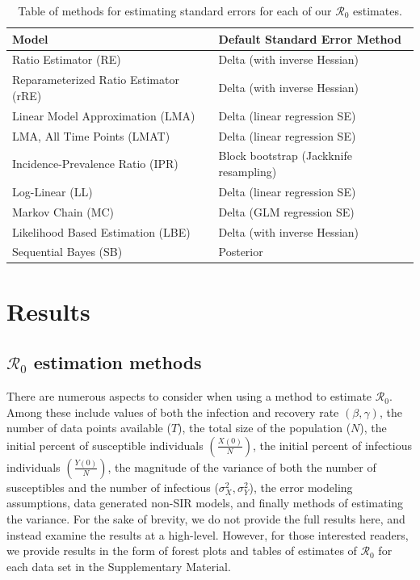 \documentclass[12pt]{article}
\newcommand{\rr}{\ensuremath{\mathcal{R}_0}}
\begin{document}
\begin{table}[H]
	\centering
	\begin{tabular}{@{}ll@{}}
		\toprule
		\textbf{Model} & \textbf{Default Standard Error Method} \\ \midrule
		Ratio Estimator (RE) & Delta (with inverse Hessian)\\
		Reparameterized Ratio Estimator (rRE) & Delta (with inverse Hessian) \\
		Linear Model Approximation (LMA) & Delta (linear regression SE) \\
		LMA, All Time Points  (LMAT)& Delta (linear regression SE)\\
		Incidence-Prevalence Ratio (IPR) & Block bootstrap (Jackknife resampling) \\
		Log-Linear (LL) & Delta (linear regression SE) \\
          Markov Chain (MC) & Delta (GLM regression SE) \\
          Likelihood Based Estimation (LBE) & Delta (with inverse Hessian)\\
		Sequential Bayes (SB) & Posterior\\
		\bottomrule
	\end{tabular}
	\caption{Table of methods for estimating standard errors for each of our $\rr$ estimates.}
	\label{tab:se-methods}
\end{table}



\section{Results}\label{sec:results-top}
\subsection{$\rr$ estimation methods}\label{sec:results}
There are numerous aspects to consider when using a method to estimate $\rr$.  Among these include values of both the infection and recovery rate $(\beta, \gamma)$, the number of data points available ($T$), the total size of the population ($N$), the initial percent of susceptible individuals $\left (\frac{X(0)}{N}\right)$, the initial percent of infectious individuals $\left (\frac{Y(0)}{N}\right )$, the magnitude of the variance of both the number of susceptibles and the number of infectious ($\sigma_X^2, \sigma_Y^2$), the error modeling assumptions, data generated non-SIR models, and finally methods of estimating the variance.  For the sake of brevity, we do not provide the full results here, and instead examine the results at a high-level.  However, for those interested readers, we provide results in the form of forest plots and tables of estimates of $\rr$ for each data set in the Supplementary Material.
\end{document}
